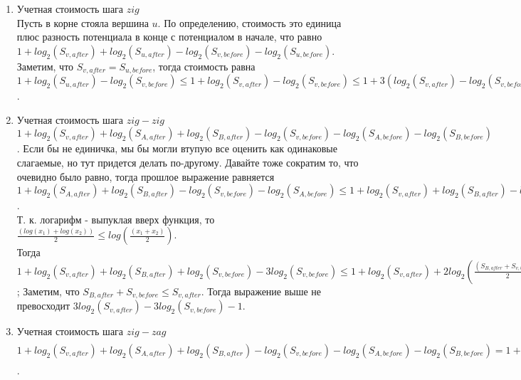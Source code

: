 \begin{enumerate}
    \item Учетная стоимость шага $zig$ \\
        Пусть в корне стояла вершина $u$. По определению, стоимость это единица плюс разность потенциала в конце с потенциалом в начале, что равно $1 + log_2(S_{v, after}) + log_2(S_{u, after}) - log_2(S_{v, before}) - log_2(S_{u, before})$. Заметим, что $S_{v, after} = S_{u, before}$, тогда стоимость равна $1 + log_2(S_{u, after}) - log_2(S_{v, before}) \leq 1 + log_2(S_{v, after}) - log_2(S_{v, before}) \leq 1 + 3(log_2(S_{v, after}) - log_2(S_{v, before}))$.
    \item Учетная стоимость шага $zig-zig$ \\
        $1 + log_2(S_{v, after}) + log_2(S_{A, after}) + log_2(S_{B, after}) - log_2(S_{v, before}) - log_2(S_{A, before}) - log_2(S_{B, before})$. Если бы не единичка, мы бы могли втупую все оценить как одинаковые слагаемые, но тут придется делать по-другому. Давайте тоже сократим то, что очевидно было равно, тогда прошлое выражение равняется $1 + log_2(S_{A, after}) + log_2(S_{B, after}) - log_2(S_{v, before}) - log_2(S_{A, before}) \leq 1 + log_2(S_{v, after}) + log_2(S_{B, after}) - log_2(S_{v, before}) - log_2(S_{v, before}) = 1 + log_2(S_{v, after}) + log_2(S_{B, after}) + log_2(S_{v, before}) - 3log_2(S_{v, before})$. \\
        Т. к. логарифм - выпуклая вверх функция, то $\frac{(log(x_1) + log(x_2))}{2} \leq log(\frac{(x_1 + x_2)}{2})$. \\
        Тогда $1 + log_2(S_{v, after}) + log_2(S_{B, after}) + log_2(S_{v, before}) - 3log_2(S_{v, before}) \leq 1 + log_2(S_{v, after}) + 2log_2(\frac{(S_{B, after} + S_{v, before})}{2}) - 3log_2(S_{v, before}) = 1 + log_2(S_{v, after}) + 2log_2(S_{B, after} + S_{v, before}) - 2 - 3log_2(S_{v, before})$; Заметим, что $S_{B, after} + S_{v, before} \leq S_{v, after}$. Тогда выражение выше не превосходит $3log_2(S_{v, after}) - 3log_2(S_{v, before}) - 1$.
    \item Учетная стоимость шага $zig-zag$ \\
        $1 + log_2(S_{v, after}) + log_2(S_{A, after}) + log_2(S_{B, after}) - log_2(S_{v, before}) - log_2(S_{A, before}) - log_2(S_{B, before}) = 1 + log_2(S_{A, after}) + log_2(S_{B, after}) - log_2(S_{v, before}) - log_2(S_{A, before}) \leq 1 + 2log_2(\frac{(S_{A, after} + S_{B, after})}{2}) - 2log_2(S_{v, before}) \leq 2log_2(S_{v, after}) - 1 - 2log_2(S_{v, before}) \leq 3(log_2(S_{v, after}) - log_2(S_{v, before}))$.
\end{enumerate}


